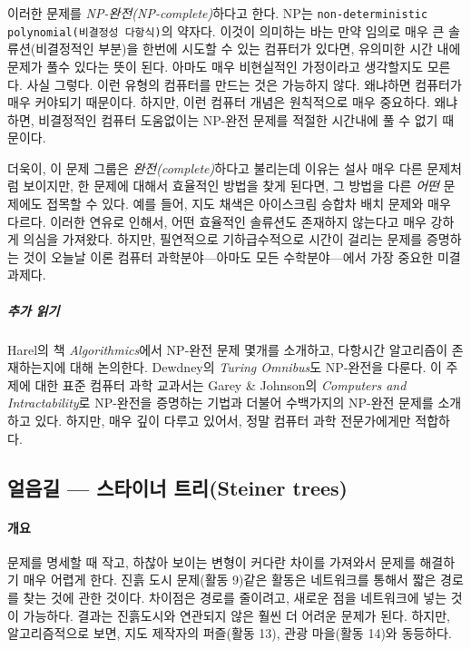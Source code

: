 \documentclass[]{article}
\begin{document}
이러한 문제를 \emph{NP-완전(NP-complete)}하다고 한다. NP는
\texttt{non-deterministic polynomial(비결정성 다항식)}의 약자다. 이것이
의미하는 바는 만약 임의로 매우 큰 솔류션(비결정적인 부분)을 한번에
시도할 수 있는 컴퓨터가 있다면, 유의미한 시간 내에 문제가 풀수 있다는
뜻이 된다. 아마도 매우 비현실적인 가정이라고 생각할지도 모른다. 사실
그렇다. 이런 유형의 컴퓨터를 만드는 것은 가능하지 않다. 왜냐하면
컴퓨터가 매우 커야되기 때문이다. 하지만, 이런 컴퓨터 개념은 원칙적으로
매우 중요하다. 왜냐하면, 비결정적인 컴퓨터 도움없이는 NP-완전 문제를
적절한 시간내에 풀 수 없기 때문이다.

더욱이, 이 문제 그룹은 \emph{완전(complete)}하다고 불리는데 이유는 설사
매우 다른 문제처럼 보이지만, 한 문제에 대해서 효율적인 방법을 찾게
된다면, 그 방법을 다른 \emph{어떤} 문제에도 접목할 수 있다. 예를 들어,
지도 채색은 아이스크림 승합차 배치 문제와 매우 다르다. 이러한 연유로
인해서, 어떤 효율적인 솔류션도 존재하지 않는다고 매우 강하게 의심을
가져왔다. 하지만, 필연적으로 기하급수적으로 시간이 걸리는 문제를
증명하는 것이 오늘날 이론 컴퓨터 과학분야---아마도 모든 수학분야---에서
가장 중요한 미결과제다.

\subparagraph{추가 읽기}\label{section-209}

Harel의 책 \emph{Algorithmics}에서 NP-완전 문제 몇개를 소개하고,
다항시간 알고리즘이 존재하는지에 대해 논의한다. Dewdney의 \emph{Turing
Omnibus}도 NP-완전을 다룬다. 이 주제에 대한 표준 컴퓨터 과학 교과서는
Garey \& Johnson의 \emph{Computers and Intractability}로 NP-완전을
증명하는 기법과 더불어 수백가지의 NP-완전 문제를 소개하고 있다. 하지만,
매우 깊이 다루고 있어서, 정말 컴퓨터 과학 전문가에게만 적합하다.

\subsection{얼음길 --- 스타이너 트리(Steiner
trees)}\label{mdash--steiner-trees}

\mbox{}\paragraph{개요}\label{section-210}

문제를 명세할 때 작고, 하찮아 보이는 변형이 커다란 차이를 가져와서
문제를 해결하기 매우 어렵게 한다. 진흙 도시 문제(활동 9)같은 활동은
네트워크를 통해서 짧은 경로를 찾는 것에 관한 것이다. 차이점은 경로를
줄이려고, 새로운 점을 네트워크에 넣는 것이 가능하다. 결과는 진흙도시와
연관되지 않은 훨씬 더 어려운 문제가 된다. 하지만, 알고리즘적으로 보면,
지도 제작자의 퍼즐(활동 13), 관광 마을(활동 14)와 동등하다.
\end{document}

